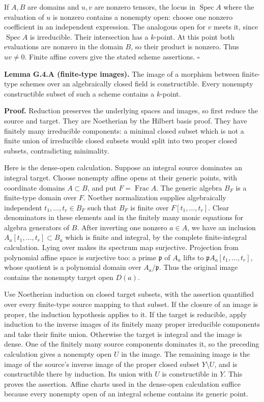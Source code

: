 \documentclass[11pt,a4paper,openany]{report}
\newcounter{none}
\begin{document}
If \(A,B\) are domains and \(u,v\) are nonzero tensors, the locus in \(\operatorname{Spec}A\) where the evaluation of \(u\) is nonzero contains a nonempty open: choose one nonzero coefficient in an independent expression. The analogous open for \(v\) meets it, since \(\operatorname{Spec}A\) is irreducible. Their intersection has a \(k\)-point. At this point both evaluations are nonzero in the domain \(B\), so their product is nonzero. Thus \(uv\ne0\). Finite affine covers give the stated scheme assertions. \(\square\)

\textbf{Lemma G.4.A (finite-type images).} The image of a morphism between finite-type schemes over an algebraically closed field is constructible. Every nonempty constructible subset of such a scheme contains a \(k\)-point.

\textbf{Proof.} Reduction preserves the underlying spaces and images, so first reduce the source and target. They are Noetherian by the Hilbert basis proof. They have finitely many irreducible components: a minimal closed subset which is not a finite union of irreducible closed subsets would split into two proper closed subsets, contradicting minimality.

Here is the dense-open calculation. Suppose an integral source dominates an integral target. Choose nonempty affine opens at their generic points, with coordinate domains \(A\subset B\), and put \(F=\operatorname{Frac}A\). The generic algebra \(B_F\) is a finite-type domain over \(F\). Noether normalization supplies algebraically independent \(t_1,\ldots,t_r\in B_F\) such that \(B_F\) is finite over \(F[t_1,\ldots,t_r]\). Clear denominators in these elements and in the finitely many monic equations for algebra generators of \(B\). After inverting one nonzero \(a\in A\), we have an inclusion \(A_a[t_1,\ldots,t_r]\subset B_a\) which is finite and integral, by the complete finite-integral calculation. Lying over makes its spectrum map surjective. Projection from polynomial affine space is surjective too: a prime \(\mathfrak p\) of \(A_a\) lifts to \(\mathfrak p A_a[t_1,\ldots,t_r]\), whose quotient is a polynomial domain over \(A_a/\mathfrak p\). Thus the original image contains the nonempty target open \(D(a)\).

Use Noetherian induction on closed target subsets, with the assertion quantified over every finite-type source mapping to that subset. If the closure of an image is proper, the induction hypothesis applies to it. If the target is reducible, apply induction to the inverse images of its finitely many proper irreducible components and take their finite union. Otherwise the target is integral and the image is dense. One of the finitely many source components dominates it, so the preceding calculation gives a nonempty open \(U\) in the image. The remaining image is the image of the source's inverse image of the proper closed subset \(Y\setminus U\), and is constructible there by induction. Its union with \(U\) is constructible in \(Y\). This proves the assertion. Affine charts used in the dense-open calculation suffice because every nonempty open of an integral scheme contains its generic point.
\end{document}
